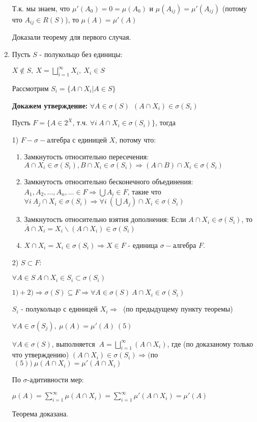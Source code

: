 \begin{enumerate}
Т.к. мы знаем, что $\mu'(A_0) = 0 = \mu(A_0)$ и $\mu(A_{ij}) = \mu'(A_{ij})$ (потому что $A_{ij} \in R(S)$), то $\mu(A) = \mu'(A)$

Доказали теорему для первого случая.

\item Пусть $S$ - полукольцо без единицы:

$X \not \in S,\ X = \bigsqcup^{\infty}_{i=1} X_i,\ X_i \in S$

Рассмотрим $S_i = \{ A \cap X_i | A \in S \}$

\textbf{Докажем утверждение:}
$\forall A \in \sigma(S)\ \ (A \cap X_i) \in \sigma(S_i)$

\Proof

Пусть $F = \{A \in 2^X$, т.ч. $\forall i\ A \cap X_i \in \sigma(S_i)\}$, тогда

1) $F - \sigma-$алгебра с единицей $X$, потому что:

\begin{enumerate}
\item Замкнутость относительно пересечения: $A \cap X_i \in \sigma(S_i), B \cap X_i \in \sigma(S_i) \Rightarrow (A \cap B) \cap X_i \in \sigma(S_i)$

\item Замкнутость относительно бесконечного объединения: $A_1, A_2, \dots, A_n,\dots \in F \Rightarrow \bigcup A_i \in F$, такие что $\forall i \ A_j \cap X_i \in \sigma(S_i) \Rightarrow \forall i\ (\bigcup A_j) \cap X_i \in \sigma(S_i)$

\item Замкнутость относительно взятия дополнения: Если $A \cap X_i \in \sigma(S_i)$, то $\overline{A} \cap X_i = X_i \backslash (A \cap X_i) \in \sigma(S_i)$

\item $X \cap X_i = X_i \in \sigma(S_i) \Rightarrow X \in F$ - единица $\sigma-$алгебра $F$. 

\end{enumerate}

2) $S \subset F$:

$\forall A \in S\ A \cap X_i \in S_i \subset \sigma(S_i)$

$1) + 2) \Rightarrow \sigma(S) \subseteq F \Rightarrow \forall A \in \sigma(S)\ A \cap X_i \in \sigma(S_i)$

\EndProof

$S_i$ - полукольцо с единицей $X_i \Rightarrow\ $ (по предыдущему пункту теоремы)

$\forall A \in \sigma(S_j),\ \mu(A) = \mu'(A) \ (5)$

$\forall A \in \sigma(S) $, выполняется $\ A = \bigsqcup^{\infty}_{i=1} (A \cap X_i)$, где (по доказаному только что утверждению) $(A \cap X_i) \in \sigma(S_i) \Rightarrow ($по$ \ (5))\ \mu(A \cap X_i) = \mu'(A \cap X_i)$

По $\sigma$-адитивности мер:

$\mu(A) = \sum_{i=1}^{\infty} \mu(A \cap X_i) = \sum_{i=1}^{\infty} \mu'(A \cap X_i) = \mu'(A)$

Теорема доказана.
\EndProof
\end{enumerate}
